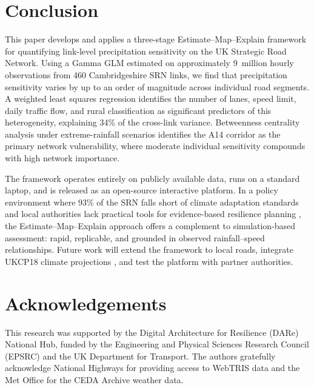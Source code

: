 \documentclass[review]{elsarticle}
\begin{document}
\section{Conclusion}
\label{sec:conclusion}

This paper develops and applies a three-stage Estimate--Map--Explain framework for quantifying link-level precipitation sensitivity on the UK Strategic Road Network. Using a Gamma GLM estimated on approximately 9~million hourly observations from 460 Cambridgeshire SRN links, we find that precipitation sensitivity varies by up to an order of magnitude across individual road segments. A weighted least squares regression identifies the number of lanes, speed limit, daily traffic flow, and rural classification as significant predictors of this heterogeneity, explaining 34\% of the cross-link variance. Betweenness centrality analysis under extreme-rainfall scenarios identifies the A14 corridor as the primary network vulnerability, where moderate individual sensitivity compounds with high network importance.

The framework operates entirely on publicly available data, runs on a standard laptop, and is released as an open-source interactive platform. In a policy environment where 93\% of the SRN falls short of climate adaptation standards \citep{nce2026srn} and local authorities lack practical tools for evidence-based resilience planning \citep{dft2024rea}, the Estimate--Map--Explain approach offers a complement to simulation-based assessment: rapid, replicable, and grounded in observed rainfall--speed relationships. Future work will extend the framework to local roads, integrate UKCP18 climate projections \citep{ukcp18}, and test the platform with partner authorities.


\section*{Acknowledgements}

This research was supported by the Digital Architecture for Resilience (DARe) National Hub, funded by the Engineering and Physical Sciences Research Council (EPSRC) and the UK Department for Transport. The authors gratefully acknowledge National Highways for providing access to WebTRIS data and the Met Office for the CEDA Archive weather data.
\end{document}

